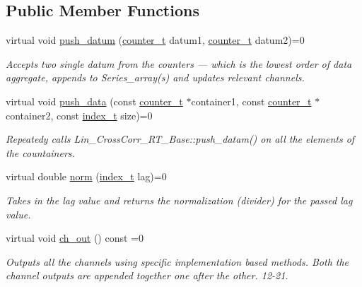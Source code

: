 \subsection*{Public Member Functions}
\begin{DoxyCompactItemize}
\item 
virtual void \hyperlink{classLin__CrossCorr__RT__Base_abdc90b5ab6a5f7ac98e97b3d16261834}{push\+\_\+datum} (\hyperlink{types_8hpp_ac89ac912f524b3e3fa3720ea55fec966}{counter\+\_\+t} datum1, \hyperlink{types_8hpp_ac89ac912f524b3e3fa3720ea55fec966}{counter\+\_\+t} datum2)=0
\begin{DoxyCompactList}\small\item\em Accepts two single {\ttfamily datum} from the counters — which is the lowest order of data aggregate, appends to Series\+\_\+array(s) and updates relevant channels. \end{DoxyCompactList}\item 
virtual void \hyperlink{classLin__CrossCorr__RT__Base_a48faa93c6766605436fd8399949beb11}{push\+\_\+data} (const \hyperlink{types_8hpp_ac89ac912f524b3e3fa3720ea55fec966}{counter\+\_\+t} $\ast$container1, const \hyperlink{types_8hpp_ac89ac912f524b3e3fa3720ea55fec966}{counter\+\_\+t} $\ast$container2, const \hyperlink{types_8hpp_a7c40bb931c31595ed6308605f4537447}{index\+\_\+t} size)=0
\begin{DoxyCompactList}\small\item\em Repeatedy calls {\ttfamily Lin\+\_\+\+Cross\+Corr\+\_\+\+R\+T\+\_\+\+Base\+::push\+\_\+datam()} on all the elements of the countainers. \end{DoxyCompactList}\item 
virtual double \hyperlink{classLin__CrossCorr__RT__Base_a43779bc7fd546fa8f73713de4bd6e285}{norm} (\hyperlink{types_8hpp_a7c40bb931c31595ed6308605f4537447}{index\+\_\+t} lag)=0
\begin{DoxyCompactList}\small\item\em Takes in the lag value and returns the normalization (divider) for the passed lag value. \end{DoxyCompactList}\item 
virtual void \hyperlink{group__Lin__CorrCorr__Base__Out_ga5d7bad992e07606a18ea828aeb768e1f}{ch\+\_\+out} () const =0
\begin{DoxyCompactList}\small\item\em Outputs all the channels using specific implementation based methods. Both the channel outputs are appended together one after the other. 12-\/21. \end{DoxyCompactList}\item 

\end{DoxyCompactItemize}
